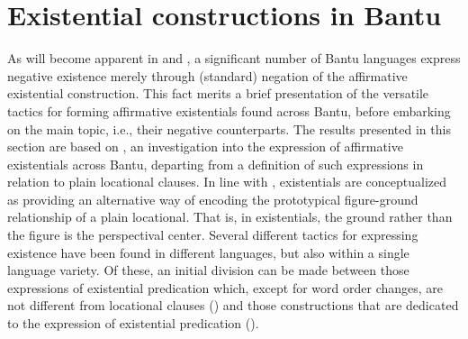 \documentclass[output=paper]{langsci/langscibook}
\begin{document}
\section{Existential constructions in Bantu}\label{sec:1:3} 
As will become apparent in  and
, a significant number of Bantu languages express
negative existence merely through (standard) negation of the affirmative
existential construction. This fact merits a brief presentation of the
versatile tactics for forming affirmative existentials found across Bantu,
before embarking on the main topic, i.e., their negative counterparts. The
results presented in this section are based on \citet{BernanderDevos2018},
an investigation into the expression of affirmative existentials across
Bantu, departing from a definition of such expressions in relation to plain
locational clauses. In line with \citet{Creissels2014,Creissels2015},
existentials are conceptualized as providing an alternative way of encoding
the prototypical figure-ground relationship of a plain locational. That is,
in existentials, the ground rather than the figure is the perspectival
center. Several different tactics for expressing existence have been found
in different languages, but also within a single language variety. Of
these, an initial division can be made between those expressions of
existential predication which, except for word order changes, are not
different from locational clauses () and those
constructions that are dedicated to the expression of existential
predication ().
\end{document}
